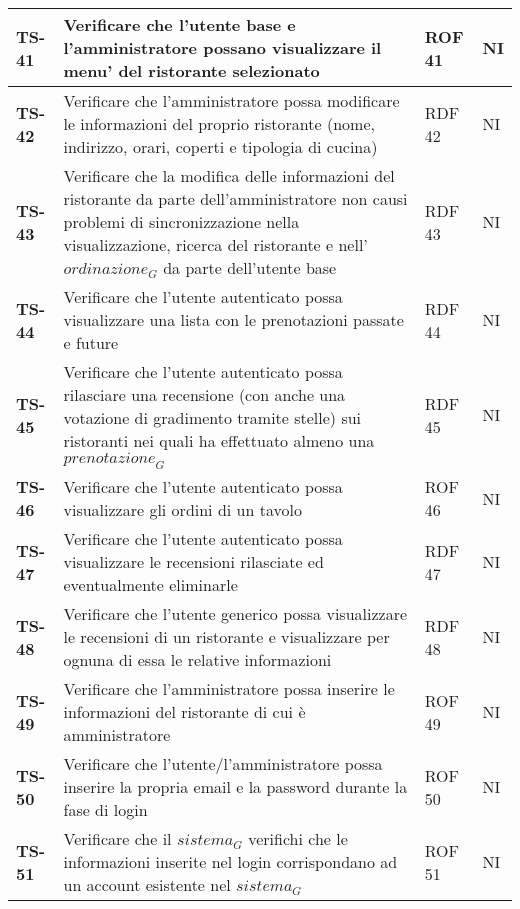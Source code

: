 \begin{longtable}{|>{\centering\arraybackslash}p{1.5cm}|p{12cm}|p{2cm}|p{1cm}|}
  \hline
  \rowcolor{gray!10}
  \textbf{TS-41} & Verificare che l'utente base e l'amministratore possano visualizzare il menu' del ristorante selezionato & ROF 41 & NI \\ 
  \hline
  \rowcolor{gray!10}
  \textbf{TS-42} & Verificare che l'amministratore possa modificare le informazioni del proprio ristorante (nome, indirizzo, orari, coperti e tipologia di cucina) & RDF 42 & NI \\
  \hline
  \rowcolor{gray!10}
  \textbf{TS-43} & Verificare che la modifica delle informazioni del ristorante da parte dell'amministratore non causi problemi di sincronizzazione nella visualizzazione, ricerca del ristorante e nell'$\textit{ordinazione}_G$ da parte dell'utente base & RDF 43 & NI \\ 
  \hline
  \rowcolor{gray!10}
  \textbf{TS-44} & Verificare che l'utente autenticato possa visualizzare una lista con le prenotazioni passate e future & RDF 44 & NI \\ 
  \hline
  \rowcolor{gray!10}
  \textbf{TS-45} & Verificare che l'utente autenticato possa rilasciare una recensione (con anche una votazione di gradimento tramite stelle) sui ristoranti nei quali ha effettuato almeno una $\textit{prenotazione}_G$ & RDF 45 & NI \\ 
  \hline
  \rowcolor{gray!10}
  \textbf{TS-46} & Verificare che l'utente autenticato possa visualizzare gli ordini di un tavolo & ROF 46 & NI \\ 
  \hline
  \rowcolor{gray!10}
  \textbf{TS-47} & Verificare che l'utente autenticato possa visualizzare le recensioni rilasciate ed eventualmente eliminarle & RDF 47 & NI \\ 
  \hline
  \rowcolor{gray!10}
  \textbf{TS-48} & Verificare che l'utente generico possa visualizzare le recensioni di un ristorante e visualizzare per ognuna di essa le relative informazioni & RDF 48 & NI \\ 
  \hline
  \rowcolor{gray!10}
  \textbf{TS-49} & Verificare che l'amministratore possa inserire le informazioni del ristorante di cui è amministratore & ROF 49 & NI \\
  \hline
  \rowcolor{gray!10}
  \textbf{TS-50} & Verificare che l'utente/l'amministratore possa inserire la propria email e la password durante la fase di login & ROF 50 & NI \\ 
  \hline
  \rowcolor{gray!10}
  \textbf{TS-51} & Verificare che il $\textit{sistema}_G$ verifichi che le informazioni inserite nel login corrispondano ad un account esistente nel $\textit{sistema}_G$ & ROF 51 & NI \\ 

\end{longtable}
